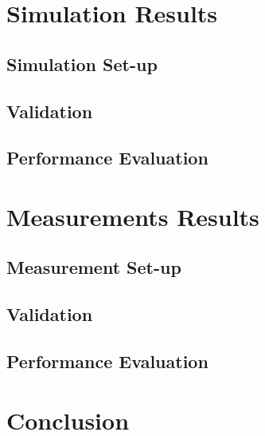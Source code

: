 \documentclass{sig-alternate}
\begin{document}
	\section{Simulation Results}
	\label{s:simulations}

	\subsection{Simulation Set-up}

	\subsection{Validation}

	\subsection{Performance Evaluation}


	\section{Measurements Results}
	\label{s:measurements}

	\subsection{Measurement Set-up}

	\subsection{Validation}

	\subsection{Performance Evaluation}


	\section{Conclusion}
	\label{s:conclusion}


	{
	
	\small
	
	}

\end{document}
